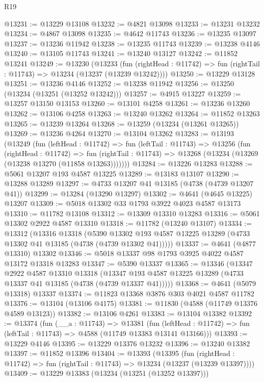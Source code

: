 \begin{lexlean}{R19}
\begin{coremodule}
@13231 := @13229 @13108
@13232 := @4821 @13098
@13233 := @13231 @13232
@13234 := @4867 @13098
@13235 := @4642 @11743
@13236 := @13235 @13097
@13237 := @13236 @11942
@13238 := @13235 @11743
@13239 := @13238 @4146
@13240 := @13105 @11743
@13241 := @13240 @13127
@13242 := @11852 @13241
@13249 := @13230
    (@13233
      (fun (rightHead : @11742) => fun (rightTail : @11743) => @13234 (@13237 (@13239 @13242))))
@13250 := @13229 @13128
@13251 := @13236 @4146
@13252 := @13238 @11942
@13256 := @13250 (@13234 (@13251 (@13252 @13242)))
@13257 := @4915 @13227
@13259 := @13257 @13150 @13153
@13260 := @13101 @4258
@13261 := @13236 @13260
@13262 := @13106 @4258
@13263 := @13240 @13262
@13264 := @11852 @13263
@13265 := @13239 @13264
@13268 := @13259 (@13234 (@13261 @13265))
@13269 := @13236 @4264
@13270 := @13104 @13262
@13283 := @13193
    (@13249
      (fun (leftHead : @11742) =>
      fun (leftTail : @11743) =>
      @13256
        (fun (rightHead : @11742) =>
        fun (rightTail : @11743) => @13268 (@13234 (@13269 (@13238 @13270 (@11858 @13263)))))))
@13284 := @13226 @13283
@13288 := @5061 @13207 @193 @4587 @13225
@13289 := @13183 @13107
@13290 := @13288 @13289
@13297 := @4733 @13207 @41 @13185 (@4738 (@4739 @13207 @41))
@13299 := @13284 (@13290 @13297)
@13302 := @4641 (@4645 @13225) @13207
@13309 := @5018 @13302 @33 @1793 @3922 @4023 @4587 @13173
@13310 := @11782 @13108
@13312 := @13309 @13310 @13283
@13316 := @5061 @13302 @2922 @4587 @13310
@13318 := @11782 (@13240 @13107)
@13334 := @13312
    (@13316
      @13318
      (@5390 @13302 @193 @4587 @13225 @13289 (@4733 @13302 @41 @13185 (@4738 (@4739 @13302 @41)))))
@13337 := @4641 (@4877 @13310) @13302
@13346 := @5018 @13337 @98 @1793 @3925 @4022 @4587 @13172 @13318 @13283
@13347 := @5390 @13337
@13365 := @13346
    (@13347
      @2922
      @4587
      @13310
      @13318
      (@13347 @193 @4587 @13225 @13289 (@4733 @13337 @41 @13185 (@4738 (@4739 @13337 @41)))))
@13368 := @4641 (@5079 @13318) @13337
@13374 := @11823 @13368 @3876 @303 @4021 @4587 @11782
@13376 := @13104 (@13106 @4175)
@13381 := @11830 (@4588 (@11749 @13376 @4589 @13123))
@13382 := @13106 @4261
@13383 := @13104 @13382
@13392 := @13374
    (fun (__a : @11743) =>
    @13381
      (fun (leftHead : @11742) => fun (leftTail : @11743) => @4588 (@11749 @13383 @13141 @13166)))
@13393 := @13229 @4146
@13395 := @13229 @13376 @13232
@13396 := @13240 @13382
@13397 := @11852 @13396
@13404 := @13393
    (@13395
      (fun (rightHead : @11742) => fun (rightTail : @11743) => @13234 (@13237 (@13239 @13397))))
@13409 := @13229 @13383 (@13234 (@13251 (@13252 @13397)))

\end{coremodule}
\end{lexlean}
